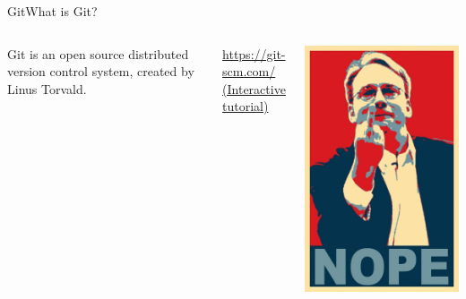 \documentclass[10pt,compress]{beamer} %
\begin{document}
\begin{frame}{Git}{What is Git?}

\begin{columns}
Git is an open source distributed version control system, created by Linus Torvald.

\url{https://git-scm.com/}
\\
\href{https://try.github.io/levels/1/challenges/1}{(Interactive tutorial)}
\begin{center}
 \includegraphics[width=.8\textwidth]{figs/torvalds-to-nvidia}
\end{center}
\end{columns}

\end{frame}
\end{document}
